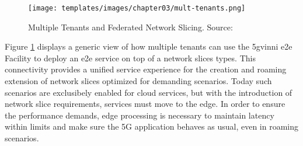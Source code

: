     \begin{figure}[!ht]
        \centering
        \texttt{[image: templates/images/chapter03/mult-tenants.png]}
        \caption{Multiple Tenants and Federated Network Slicing. Source: }
        \label{fig:multiple-tenants}
    \end{figure}     
    
    Figure \ref{fig:multiple-tenants} displays a generic view of how multiple tenants can use the \acrshort{5gvinni} \acrshort{e2e} Facility to deploy an \acrshort{e2e} service on top of a network slices types. This connectivity provides a unified service experience for the creation and roaming extension of network slices optimized for demanding scenarios. Today such scenarios are exclusibely enabled for cloud services, but with the introduction of network slice requirements, services must move to the edge. In order to ensure the performance demands, edge processing is necessary to maintain latency within limits and make sure the 5G application behaves as usual, even in roaming scenarios.

%    
%    
    
    
